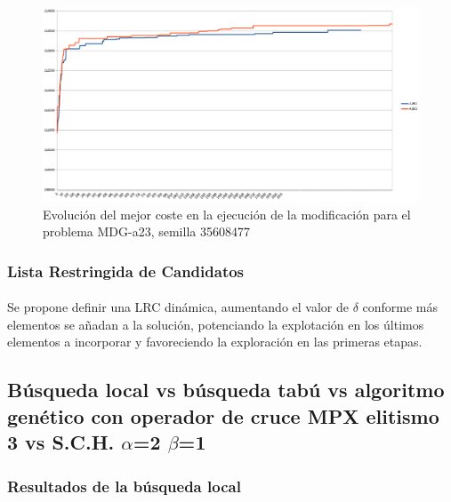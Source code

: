 	\begin{figure}[H]
		\centering
		\includegraphics[scale=0.3]{img/convergenciaMDG3mejora.png}
		\caption{Evolución del mejor coste en la ejecución de la modificación para el problema MDG-a23, semilla 35608477}
		\label{MDG-a_23_convergencia_mejora}
	\end{figure}
	
	\subsubsection{Lista Restringida de Candidatos}
	
		\paragraph{} Se propone definir una LRC dinámica, aumentando el valor de $\delta$ conforme más elementos se añadan a la solución, potenciando la explotación en los últimos elementos a incorporar y favoreciendo la exploración en las primeras etapas.
	
	\subsection{Búsqueda local vs búsqueda tabú vs algoritmo genético con operador de cruce MPX elitismo 3 vs S.C.H. $\alpha$=2 $\beta$=1}
	
	\subsubsection{Resultados de la búsqueda local}
	
